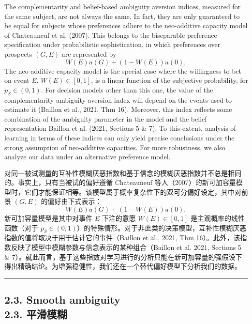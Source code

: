 \documentclass[12pt,a4paper]{article}
\newenvironment{original}
  {\par\vspace{0.5em}\noindent\color{black}\ignorespaces}
  {\par\vspace{0.3em}}
\newenvironment{translation}
  {\par\noindent\color{transblue}\ignorespaces}
  {\par\vspace{0.8em}\hrule\vspace{0.5em}}
\newcommand{\bilingualsubsection}[2]{%
  \subsection{\texorpdfstring{#1 \\[0.2em] {\normalsize\color{transblue}#2}}{#1}}
}
\begin{document}
\begin{original}
The complementarity and belief-based ambiguity aversion indices, measured for the same subject, are not always the same. In fact, they are only guaranteed to be equal for subjects whose preferences adhere to the neo-additive capacity model of Chateauneuf et al. (2007). This belongs to the biseparable preference specification under probabilistic sophistication, in which preferences over prospects $(G, E)$ are represented by
\begin{equation}
W(E)u(G) + (1 - W(E))u(0), \label{eq:bisep}
\end{equation}
The neo-additive capacity model is the special case where the willingness to bet on event $E$, $W(E) \in [0, 1]$, is a linear function of the subjective probability, for $p_S \in (0, 1)$. For decision models other than this one, the value of the complementarity ambiguity aversion index will depend on the events used to estimate it (Baillon et al., 2021, Thm 16). Moreover, this index reflects some combination of the ambiguity parameter in the model and the belief representation Baillon et al. (2021, Sections 5 \& 7). To this extent, analysis of learning in terms of these indices can only yield precise conclusions under the strong assumption of neo-additive capacities. For more robustness, we also analyze our data under an alternative preference model.
\end{original}

\begin{translation}
对同一被试测量的互补性模糊厌恶指数和基于信念的模糊厌恶指数并不总是相同的。事实上，只有当被试的偏好遵循 Chateauneuf 等人（2007）的新可加容量模型时，它们才能保证相等。该模型属于概率复杂性下的双可分偏好设定，其中对前景 $(G, E)$ 的偏好由下式表示：
\begin{equation}
W(E)u(G) + (1 - W(E))u(0),
\end{equation}
新可加容量模型是其中对事件 $E$ 下注的意愿 $W(E) \in [0, 1]$ 是主观概率的线性函数（对于 $p_S \in (0, 1)$）的特殊情形。对于非此类的决策模型，互补性模糊厌恶指数的值将取决于用于估计它的事件（Baillon et al., 2021, Thm 16）。此外，该指数反映了模型中模糊参数与信念表示的某种组合（Baillon et al. 2021, Sections 5 \& 7）。就此而言，基于这些指数对学习进行的分析只能在新可加容量的强假设下得出精确结论。为增强稳健性，我们还在一个替代偏好模型下分析我们的数据。
\end{translation}
\bilingualsubsection{2.3. Smooth ambiguity}{2.3. 平滑模糊}
\end{document}
